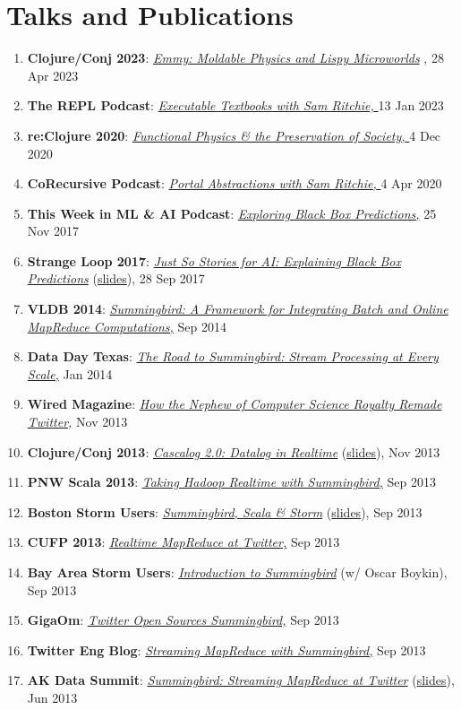 \documentclass[letterpaper,11pt]{article}
\newcommand{\resumeItem}[2]{\item\small{
    \textbf{#1}{: #2 \vspace{-2pt}}
  }
}
\newcommand{\itlink}[2]{
  \href{#1}{\textit{#2}}
}
\begin{document}
\section{Talks and Publications}
\begin{enumerate}
  \resumeItem{Clojure/Conj 2023}{\itlink{https://www.youtube.com/watch?v=B9kqD8vBuwU}{Emmy: Moldable Physics and Lispy Microworlds}, 28 Apr 2023}
  \resumeItem{The REPL Podcast}{\itlink{https://www.therepl.net/episodes/47/}{Executable Textbooks with Sam Ritchie, } 13 Jan 2023}
  \resumeItem{re:Clojure 2020}{\itlink{https://www.youtube.com/watch?v=8AxMp0nfN7s}{Functional Physics \& the Preservation of Society, } 4 Dec 2020}
  \resumeItem{CoRecursive Podcast}{\itlink{https://corecursive.com/050-sam-ritchie-portal-abstractions/}{Portal Abstractions with Sam Ritchie, } 4 Apr 2020}
  \resumeItem{This Week in ML \& AI Podcast}{\itlink{https://twimlai.com/twiml-talk-73-exploring-black-box-predictions-sam-ritchie/}{Exploring Black Box Predictions,} 25 Nov 2017}
  \resumeItem{Strange Loop 2017}{\itlink{https://www.youtube.com/watch?v=DiWkKqZChF0}{Just So Stories for AI: Explaining Black Box Predictions} (\href{https://speakerdeck.com/sritchie/just-so-stories-for-ai-explaining-black-box-predictions}{slides}), 28 Sep 2017}
  \resumeItem{VLDB 2014}{\itlink{http://www.vldb.org/pvldb/vol7/p1441-boykin.pdf}{Summingbird: A Framework for Integrating Batch and Online MapReduce Computations,} Sep 2014}
  \resumeItem{Data Day Texas}{\itlink{https://speakerdeck.com/sritchie/the-road-to-summingbird-stream-processing-at-every-scale}{The Road to Summingbird: Stream Processing at Every Scale,} Jan 2014}
  \resumeItem{Wired Magazine}{\itlink{http://www.wired.com/wiredenterprise/2013/11/twitter-summingbird/}{How the Nephew of Computer Science Royalty Remade Twitter,} Nov 2013}
  \resumeItem{Clojure/Conj 2013}{\itlink{http://www.youtube.com/watch?v=uuJW3EaN_3Q}{Cascalog 2.0: Datalog in Realtime}(\href{https://speakerdeck.com/sritchie/cascalog-2-dot-0-datalog-in-realtime}{slides}), Nov 2013}
  \resumeItem{PNW Scala 2013}{\itlink{http://www.youtube.com/watch?v=iuvauJZaMqA}{Taking Hadoop Realtime with Summingbird,} Sep 2013}
  \resumeItem{Boston Storm Users}{\itlink{https://vimeo.com/75516079}{Summingbird, Scala \& Storm}(\href{https://speakerdeck.com/sritchie/boston-storm-users-summingbird-scala-and-storm}{slides}), Sep 2013}
  \resumeItem{CUFP 2013}{\itlink{https://speakerdeck.com/sritchie/summingbird-at-cufp}{Realtime MapReduce at Twitter,} Sep 2013}
  \resumeItem{Bay Area Storm Users}{\itlink{http://www.youtube.com/watch?v=23scdoxHOLg}{Introduction to Summingbird} (w/ Oscar Boykin), Sep 2013}
  \resumeItem{GigaOm}{\itlink{http://gigaom.com/2013/09/03/twitter-open-sources-storm-hadoop-hybrid-called-summingbird/}{Twitter Open Sources Summingbird,} Sep 2013}
  \resumeItem{Twitter Eng Blog}{\itlink{https://blog.twitter.com/2013/streaming-mapreduce-with-summingbird}{Streaming MapReduce with Summingbird,} Sep 2013}
  \resumeItem{AK Data Summit}{\itlink{http://www.youtube.com/watch?v=Y3PETLJeP7o}{Summingbird: Streaming MapReduce at Twitter}(\href{https://speakerdeck.com/sritchie/summingbird-streaming-mapreduce-at-twitter}{slides}), Jun 2013}
\end{enumerate}

\end{document}
